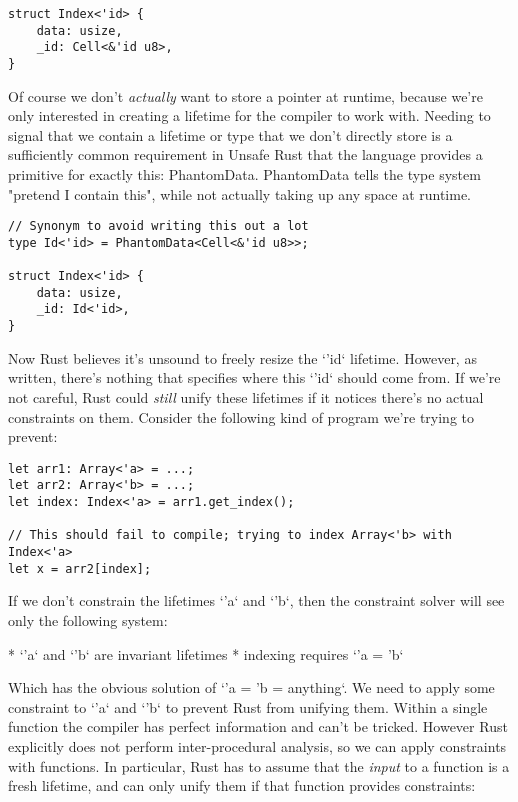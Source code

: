 \begin{verbatim}
struct Index<'id> {
    data: usize,
    _id: Cell<&'id u8>,
}
\end{verbatim}

Of course we don't \emph{actually} want to store a pointer at runtime, because we're
only interested in creating a lifetime for the compiler to work with. Needing to
signal that we contain a lifetime or type that we don't directly store is a
sufficiently common requirement in Unsafe Rust that the language provides a primitive
for exactly this: PhantomData. PhantomData tells the type system "pretend I
contain this", while not actually taking up any space at runtime.

\begin{verbatim}
// Synonym to avoid writing this out a lot
type Id<'id> = PhantomData<Cell<&'id u8>>;

struct Index<'id> {
    data: usize,
    _id: Id<'id>,
}
\end{verbatim}

Now Rust believes it's unsound to freely resize the `'id` lifetime. However, as
written, there's nothing that specifies where this `'id` should come from. If
we're not careful, Rust could \emph{still} unify these lifetimes if it notices
there's no actual constraints on them. Consider the following kind of program
we're trying to prevent:

\begin{verbatim}
let arr1: Array<'a> = ...;
let arr2: Array<'b> = ...;
let index: Index<'a> = arr1.get_index();

// This should fail to compile; trying to index Array<'b> with Index<'a>
let x = arr2[index];
\end{verbatim}

If we don't constrain the lifetimes `'a` and `'b`, then the constraint solver
will see only the following system:

* `'a` and `'b` are invariant lifetimes
* indexing requires `'a = 'b`

Which has the obvious solution of `'a = 'b = anything`. We need to apply some
constraint to `'a` and `'b` to prevent Rust from unifying them. Within a single
function the compiler has perfect information and can't be tricked. However
Rust explicitly does not perform inter-procedural analysis, so we can apply
constraints with functions. In particular, Rust has to assume that the \emph{input}
to a function is a fresh lifetime, and can only unify them if that function
provides constraints:

